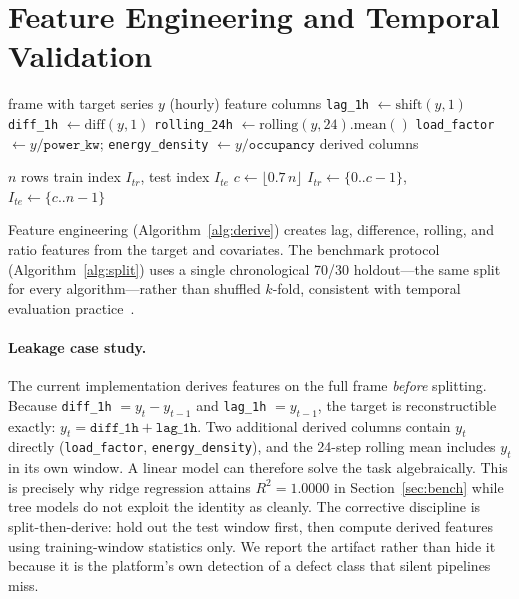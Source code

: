 \documentclass[conference]{IEEEtran}
\begin{document}
\section{Feature Engineering and Temporal Validation}\label{sec:feat}

\begin{algorithm}[!t]
\caption{DeriveTimeSeriesFeatures}
\label{alg:derive}
\begin{algorithmic}[1]
\REQUIRE frame with target series $y$ (hourly)
\ENSURE feature columns
\STATE \texttt{lag\_1h} $\gets \mathrm{shift}(y,1)$ 
\STATE \texttt{diff\_1h} $\gets \mathrm{diff}(y,1)$ 
\STATE \texttt{rolling\_24h} $\gets \mathrm{rolling}(y,24).\mathrm{mean}()$ 
\STATE \texttt{load\_factor} $\gets y / \texttt{power\_kw}$; \quad \texttt{energy\_density} $\gets y / \texttt{occupancy}$
\RETURN derived columns
\end{algorithmic}
\end{algorithm}

\begin{algorithm}[!t]
\caption{TimeOrderedSplit}
\label{alg:split}
\begin{algorithmic}[1]
\REQUIRE $n$ rows
\ENSURE train index $I_{tr}$, test index $I_{te}$
\STATE $c \gets \lfloor 0.7\,n \rfloor$
\RETURN $I_{tr} \gets \{0..c-1\}$, \ $I_{te} \gets \{c..n-1\}$
\end{algorithmic}
\end{algorithm}

Feature engineering (Algorithm~\ref{alg:derive}) creates lag, difference, rolling, and ratio features from the target and covariates. The benchmark protocol (Algorithm~\ref{alg:split}) uses a single chronological 70/30 holdout---the same split for every algorithm---rather than shuffled $k$-fold, consistent with temporal evaluation practice~\cite{bergmeir:2012, hyndman:2021}.

\paragraph{Leakage case study.}
The current implementation derives features on the full frame \emph{before} splitting. Because \texttt{diff\_1h} $= y_t - y_{t-1}$ and \texttt{lag\_1h} $= y_{t-1}$, the target is reconstructible exactly: $y_t = \texttt{diff\_1h} + \texttt{lag\_1h}$. Two additional derived columns contain $y_t$ directly (\texttt{load\_factor}, \texttt{energy\_density}), and the 24-step rolling mean includes $y_t$ in its own window. A linear model can therefore solve the task algebraically. This is precisely why ridge regression attains $R^2=1.0000$ in Section~\ref{sec:bench} while tree models do not exploit the identity as cleanly. The corrective discipline is split-then-derive: hold out the test window first, then compute derived features using training-window statistics only. We report the artifact rather than hide it because it is the platform's own detection of a defect class that silent pipelines miss.
\end{document}
